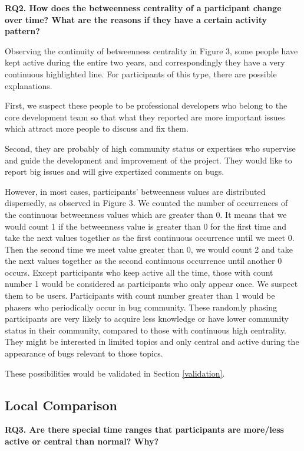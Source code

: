 \documentclass[10pt, conference, compsocconf]{IEEEtran}
\begin{document}
\textbf{RQ2. How does the betweenness centrality of a participant change over time? What are the reasons if they have a certain activity pattern?}

Observing the continuity of betweenness centrality in Figure 3, some people have kept active during the entire two years, and correspondingly they have a very continuous highlighted line. For participants of this type, there are possible explanations. 

First, we suspect these people to be professional developers who belong to the core development team so that what they reported are more important issues which attract more people to discuss and fix them. 

Second, they are probably of high community status or expertises who supervise and guide the development and improvement of the project. They would like to report big issues and will give expertized comments on bugs. 

However, in most cases, participants' betweenness values are distributed dispersedly, as observed in Figure 3. We counted the number of occurrences of the continuous betweenness values which are greater than 0. It means that we would count 1 if the betweenness value is greater than 0 for the first time and take the next values together as the first continuous occurrence until we meet 0. Then the second time we meet value greater than 0, we would count 2 and take the next values together as the second continuous occurrence until another 0 occurs. Except participants who keep active all the time, those with count number 1 would be considered as participants who only appear once. We suspect them to be users. Participants with count number greater than 1 would be phasers who periodically occur in bug community. These randomly phasing participants are very likely to acquire less knowledge or have lower community status in their community, compared to those with continuous high centrality. They might be interested in limited topics and only central and active during the appearance of bugs relevant to those topics.

These possibilities would be validated in Section \ref{validation}.

\subsection{Local Comparison}
\label{local}

\textbf{RQ3. Are there special time ranges that participants are more/less active or central than normal? Why?}
\end{document}
